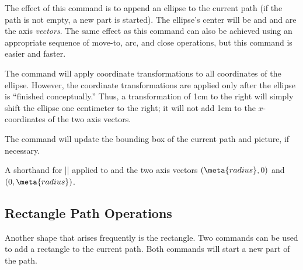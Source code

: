 \begin{command}{\pgfpathellipse{}}
    The effect of this command is to append an ellipse to the current path (if
    the path is not empty, a new part is started). The ellipse's center will be
     and  and  are the axis
    \emph{vectors}. The same effect as this command can also be achieved using
    an appropriate sequence of move-to, arc, and close operations, but this
    command is easier and faster.
\begin{codeexample}[]
\end{codeexample}

    The command will apply coordinate transformations to all coordinates of the
    ellipse. However, the coordinate transformations are applied only after the
    ellipse is ``finished conceptually.'' Thus, a transformation of 1cm to the
    right will simply shift the ellipse one centimeter to the right; it will
    not add 1cm to the $x$-coordinates of the two axis vectors.

    The command will update the bounding box of the current path and picture,
    if necessary.
\end{command}

\begin{command}{\pgfpathcircle{}}
    A shorthand for |\pgfpathellipse| applied to  and the two axis
    vectors $(\meta{radius},0)$ and $(0,\meta{radius})$.
\end{command}


\subsection{Rectangle Path Operations}

Another shape that arises frequently is the rectangle. Two commands can be used
to add a rectangle to the current path. Both commands will start a new part of
the path.

